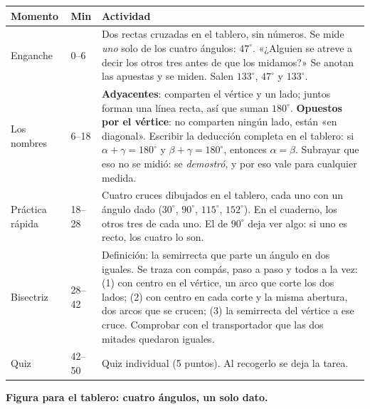 \documentclass[11pt]{article}
\begin{document}
\begin{center}
{\renewcommand{\arraystretch}{1.3}
\begin{tabularx}{\linewidth}{@{}l l X@{}}
  \toprule
  \textbf{Momento} & \textbf{Min} & \textbf{Actividad}\\
  \midrule
  Enganche & 0--6 & Dos rectas cruzadas en el tablero, sin números. Se mide \emph{uno} solo de
    los cuatro ángulos: $47^\circ$. «¿Alguien se atreve a decir los otros tres antes de que los
    midamos?» Se anotan las apuestas y se miden. Salen $133^\circ$, $47^\circ$ y $133^\circ$.\\
  Los nombres & 6--18 & \textbf{Adyacentes}: comparten el vértice y un lado; juntos forman una
    línea recta, así que suman $180^\circ$. \textbf{Opuestos por el vértice}: no comparten
    ningún lado, están «en diagonal». Escribir la deducción completa en el tablero: si
    $\alpha + \gamma = 180^\circ$ y $\beta + \gamma = 180^\circ$, entonces $\alpha = \beta$.
    Subrayar que eso no se midió: se \emph{demostró}, y por eso vale para cualquier medida.\\
  Práctica rápida & 18--28 & Cuatro cruces dibujados en el tablero, cada uno con un ángulo
    dado ($30^\circ$, $90^\circ$, $115^\circ$, $152^\circ$). En el cuaderno, los otros tres de
    cada uno. El de $90^\circ$ deja ver algo: si uno es recto, los cuatro lo son.\\
  Bisectriz & 28--42 & Definición: la semirrecta que parte un ángulo en dos iguales. Se traza
    con compás, paso a paso y todos a la vez: (1) con centro en el vértice, un arco que corte
    los dos lados; (2) con centro en cada corte y la misma abertura, dos arcos que se crucen;
    (3) la semirrecta del vértice a ese cruce. Comprobar con el transportador que las dos
    mitades quedaron iguales.\\
  Quiz & 42--50 & Quiz individual (5 puntos). Al recogerlo se deja la tarea.\\
  \bottomrule
\end{tabularx}}
\end{center}

\textbf{Figura para el tablero: cuatro ángulos, un solo dato.}

\begin{center}
\end{center}
\end{document}
